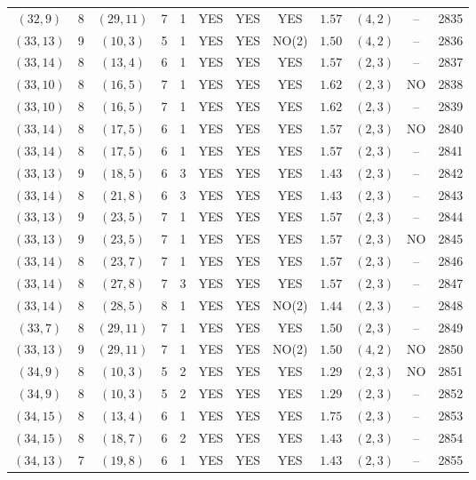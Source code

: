 \begin{longtable}{|c|c|c|c|c|c|c|c|c|c|c|c|}
$(32,9)$ & 8 & $(29,11)$ & 7 & 1 & YES & YES & YES & $1.57$ & $(4,2)$ & -- & 2835\\
$(33,13)$ & 9 & $(10,3)$ & 5 & 1 & YES & YES & NO(2) & $1.50$ & $(4,2)$ & -- & 2836\\
$(33,14)$ & 8 & $(13,4)$ & 6 & 1 & YES & YES & YES & $1.57$ & $(2,3)$ & -- & 2837\\
$(33,10)$ & 8 & $(16,5)$ & 7 & 1 & YES & YES & YES & $1.62$ & $(2,3)$ & NO & 2838\\
$(33,10)$ & 8 & $(16,5)$ & 7 & 1 & YES & YES & YES & $1.62$ & $(2,3)$ & -- & 2839\\
$(33,14)$ & 8 & $(17,5)$ & 6 & 1 & YES & YES & YES & $1.57$ & $(2,3)$ & NO & 2840\\
$(33,14)$ & 8 & $(17,5)$ & 6 & 1 & YES & YES & YES & $1.57$ & $(2,3)$ & -- & 2841\\
$(33,13)$ & 9 & $(18,5)$ & 6 & 3 & YES & YES & YES & $1.43$ & $(2,3)$ & -- & 2842\\
$(33,14)$ & 8 & $(21,8)$ & 6 & 3 & YES & YES & YES & $1.43$ & $(2,3)$ & -- & 2843\\
$(33,13)$ & 9 & $(23,5)$ & 7 & 1 & YES & YES & YES & $1.57$ & $(2,3)$ & -- & 2844\\
$(33,13)$ & 9 & $(23,5)$ & 7 & 1 & YES & YES & YES & $1.57$ & $(2,3)$ & NO & 2845\\
$(33,14)$ & 8 & $(23,7)$ & 7 & 1 & YES & YES & YES & $1.57$ & $(2,3)$ & -- & 2846\\
$(33,14)$ & 8 & $(27,8)$ & 7 & 3 & YES & YES & YES & $1.57$ & $(2,3)$ & -- & 2847\\
$(33,14)$ & 8 & $(28,5)$ & 8 & 1 & YES & YES & NO(2) & $1.44$ & $(2,3)$ & -- & 2848\\
$(33,7)$ & 8 & $(29,11)$ & 7 & 1 & YES & YES & YES & $1.50$ & $(2,3)$ & -- & 2849\\
$(33,13)$ & 9 & $(29,11)$ & 7 & 1 & YES & YES & NO(2) & $1.50$ & $(4,2)$ & NO & 2850\\
$(34,9)$ & 8 & $(10,3)$ & 5 & 2 & YES & YES & YES & $1.29$ & $(2,3)$ & NO & 2851\\
$(34,9)$ & 8 & $(10,3)$ & 5 & 2 & YES & YES & YES & $1.29$ & $(2,3)$ & -- & 2852\\
$(34,15)$ & 8 & $(13,4)$ & 6 & 1 & YES & YES & YES & $1.75$ & $(2,3)$ & -- & 2853\\
$(34,15)$ & 8 & $(18,7)$ & 6 & 2 & YES & YES & YES & $1.43$ & $(2,3)$ & -- & 2854\\
$(34,13)$ & 7 & $(19,8)$ & 6 & 1 & YES & YES & YES & $1.43$ & $(2,3)$ & -- & 2855\\

\end{longtable}
